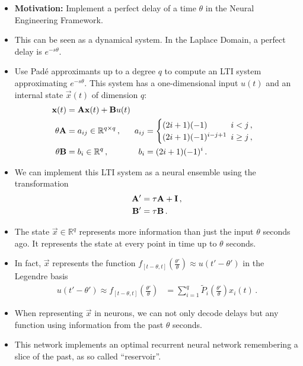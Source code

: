 \documentclass[10pt,letterpaper,oneside]{article}
\begin{document}
\begin{itemize}
	\item \textbf{Motivation:} Implement a perfect delay of a time $\theta$ in the Neural Engineering Framework.
	\item This can be seen as a dynamical system. In the Laplace Domain, a perfect delay is $e^{-s\theta}$.
	\item Use Padé approximants up to a degree $q$ to compute an LTI system approximating $e^{-s\theta}$. This system has a one-dimensional input $u(t)$ and an internal state $\vec x(t)$ of dimension $q$:
	\begin{align*}
		{\mathbf{x}}(t) &= {\mathbf{A}} {\mathbf{x}}(t) + {\mathbf{B}} u(t) \\
	    \theta {\mathbf{A}} &= a_{ij} \in \mathbb{R}^{q \times q} \,, & \kern-0.5em a_{ij} &= \begin{cases}
		(2i + 1)(-1) & \kern-0.5em i < j \,,\\
		(2i + 1)(-1)^{i - j + 1} & \kern-0.5em i \geq j \,,
		\end{cases}\\
		\theta {\mathbf{B}} &= b_i \in \mathbb{R}^{q} \,, & \kern-0.5em b_i &= (2i + 1)(-1)^i \,.
	\end{align*}
	\item We can implement this LTI system as a neural ensemble using the transformation
	\begin{align*}
		{\mathbf{A}}' &= \tau {\mathbf{A}} + {\mathbf{I}} \,,\\
		{\mathbf{B}}' &= \tau {\mathbf{B}} \,.
	\end{align*}
	\item The state $\vec x \in \mathbb{R}^q$ represents more information than just the input $\theta$ seconds ago. It represents the state at every point in time up to $\theta$ seconds.
	\item In fact, $\vec x$ represents the function $f_{[t - \theta, t]}\left(\frac{\theta'}{\theta}\right) \approx u\left(t' - \theta' \right)$ in the Legendre basis
	\begin{align*}
		u\left(t' - \theta' \right) \approx f_{[t - \theta, t]}\left(\frac{\theta'}{\theta}\right) &= \sum_{i=1}^q \tilde P_i \left( \frac{\theta'}{\theta} \right) x_i(t) \,.
	\end{align*}
	\item When representing $\vec x$ in neurons, we can not only decode delays but any function using information from the past $\theta$ seconds.
	\item This network implements an optimal recurrent neural network remembering a slice of the past, as so called \enquote{reservoir}.
\end{itemize}

\printbibliography
\end{document}
